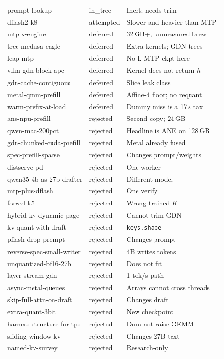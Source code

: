 {\begin{longtable}{@{}p{4.0cm}lp{8.4cm}@{}}
prompt-lookup & in\_tree & Inert: needs trim \\
dflash2-k8 & attempted & Slower and heavier than MTP \\
mtplx-engine & deferred & 32\,GB+; unmeasured brew \\
tree-medusa-eagle & deferred & Extra kernels; GDN trees \\
leap-mtp & deferred & No L-MTP ckpt here \\
vllm-gdn-block-apc & deferred & Kernel does not return $h$ \\
gdn-cache-contiguous & deferred & Slice leak class \\
metal-qmm-prefill & deferred & Affine-4 floor; no requant \\
warm-prefix-at-load & deferred & Dummy miss is a 17\,s tax \\
ane-npu-prefill & rejected & Second copy; 24\,GB \\
qwen-mac-200pct & rejected & Headline is ANE on 128\,GB \\
gdn-chunked-cuda-prefill & rejected & Metal already fused \\
spec-prefill-sparse & rejected & Changes prompt/weights \\
distserve-pd & rejected & One worker \\
qwen35-4b-as-27b-drafter & rejected & Different model \\
mtp-plus-dflash & rejected & One verify \\
forced-k5 & rejected & Wrong trained $K$ \\
hybrid-kv-dynamic-page & rejected & Cannot trim GDN \\
kv-quant-with-draft & rejected & \texttt{keys.shape} \\
pflash-drop-prompt & rejected & Changes prompt \\
reverse-spec-small-writer & rejected & 4B writes tokens \\
unquantized-bf16-27b & rejected & Does not fit \\
layer-stream-gdn & rejected & 1 tok/s path \\
async-metal-queues & rejected & Arrays cannot cross threads \\
skip-full-attn-on-draft & rejected & Changes draft \\
extra-quant-3bit & rejected & New checkpoint \\
harness-structure-for-tps & rejected & Does not raise GEMM \\
sliding-window-kv & rejected & Changes 27B text \\
named-kv-survey & rejected & Research-only \\
\bottomrule
\end{longtable}
}

